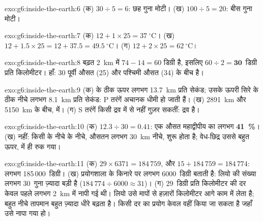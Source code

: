 \begin{solution}{exo:g6:inside-the-earth:6}
(क) $30 \div 5 = 6$: छह गुना मोटी। (ख) $100 \div 5 = 20$: बीस गुना
मोटी।
\end{solution}

\begin{solution}{exo:g6:inside-the-earth:7}
(क) $12 + 1 \times 25 = 37~^\circ$C। (ख) $12 + 1.5 \times 25 = 12 + 37.5 =
49.5~^\circ$C। (ग) $12 + 2 \times 25 = 62~^\circ$C।
\end{solution}

\begin{solution}{exo:g6:inside-the-earth:8}
बढ़त 2~km में $74 - 14 = 60$ डिग्री है, इसलिए $60 \div 2 =
\textbf{30}$~डिग्री प्रति किलोमीटर। हाँ: 30 पूर्वी औसत
(25) और पश्चिमी औसत (34) के बीच है।
\end{solution}

\begin{solution}{exo:g6:inside-the-earth:9}
(क)  के ठीक ऊपर लगभग 13.7~km प्रति सेकंड; उसके ऊपरी सिरे के ठीक नीचे
लगभग 8.1~km प्रति सेकंड: P तरंगें अचानक धीमी हो जाती हैं। (ख)
2891~km और 5150~km के बीच,  में। (ग) S तरंगें किसी द्रव में से नहीं
गुज़र सकतीं:  द्रव है।
\end{solution}

\begin{solution}{exo:g6:inside-the-earth:10}
(क) $12.3 \div 30 = 0.41$: एक औसत महाद्वीपीय  का लगभग
\textbf{41~\%}। (ख) नहीं: किसी  के नीचे   के नीचे, औसतन
लगभग 30~km नीचे, शुरू होता है; वेध-छिद्र उससे बहुत ऊपर,  में ही रुक गया।
\end{solution}

\begin{solution}{exo:g6:inside-the-earth:11}
(क) $29 \times 6371 = 184\,759$, और $15 + 184\,759 = 184\,774$: लगभग
185\,000~डिग्री। (ख) प्रयोगशाला  के किनारे पर लगभग 6000~डिग्री
बताती है: लियो की संख्या लगभग 30~गुना ज़्यादा बड़ी है
($184\,774 \div 6000 \approx 31$)। (ग) 29~डिग्री प्रति किलोमीटर की दर
केवल पहले लगभग 2~km में नापी गई थी। लियो उसे मापों से हज़ारों
किलोमीटर आगे काम में लेता है; बहुत नीचे तापमान बहुत ज़्यादा
धीरे बढ़ता है। किसी दर का प्रयोग केवल वहीं किया जा सकता है जहाँ उसे नापा गया हो।
\end{solution}

